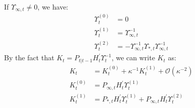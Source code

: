 \documentclass[12pt]{article}
\numberwithin{equation}{section}
\begin{document}
If $\Upsilon_{\infty,t}\neq 0$, we have:
\begin{align*}
    \Upsilon_t^{(0)} &= 0 \\
    \Upsilon_t^{(1)} &= \Upsilon_{\infty,t}^{-1} \\
    \Upsilon_t^{(2)} &= -\Upsilon_{\infty,t}^{-1}\Upsilon_{*,t}\Upsilon_{\infty,t}^{-1}
\end{align*}
By the fact that $K_t = P_{t|t-1}H_t^{'}\Upsilon_t^{-1}$, we can write $K_t$ as:
\begin{align}
    K_t &= K_t^{(0)} + \kappa^{-1}K_t^{(1)} + \mathcal{O}(\kappa^{-2}) \label{eq:K1_diffuse_start} \\
    K_t^{(0)} &= P_{\infty,t}H_t^{'}\Upsilon_t^{(1)} \\
    K_t^{(1)} &= P_{*,t}H_t^{'}\Upsilon_t^{(1)} + P_{\infty,t}H_t^{'}\Upsilon_t^{(2)} \label{eq:K1_diffuse_end}
\end{align}
\end{document}

